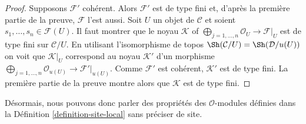 \begin{proof}
\medskip\noindent
Supposons $\mathcal{F}'$ cohérent. Alors $\mathcal{F}'$ est de type fini et,
d'après la première partie de la preuve, $\mathcal{F}$ l'est aussi.
Soit $U$ un objet de $\mathcal{C}$ et soient
$s_1, \ldots, s_n \in \mathcal{F}(U)$. Il faut montrer que le noyau
$\mathcal{K}$ of
$\bigoplus_{j = 1, \ldots, n} \mathcal{O}_U \to \mathcal{F}|_U$
est de type fini sur $\mathcal{C}/U$. En utilisant l'isomorphisme de topos
$\Sh(\mathcal{C}/U) = \Sh(\mathcal{D}/u(U))$
on voit que $\mathcal{K}|_U$ correspond au noyau
$\mathcal{K}'$ d'un morphisme
$\bigoplus_{j = 1, \ldots, n} \mathcal{O}_{u(U)} \to \mathcal{F}'|_{u(U)}$.
Comme $\mathcal{F}'$ est cohérent, $\mathcal{K}'$ est de type fini.
La première partie de la preuve montre alors que $\mathcal{K}$ est de type
fini.
\end{proof}

\noindent
Désormais, nous pouvons donc parler des propriétés des
$\mathcal{O}$-modules définies dans la Définition \ref{definition-site-local}
sans préciser de site.

